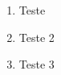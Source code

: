 \begin{question}

	\begin{enumerate}[label=\textbf{\alph*})]
		\item Teste
  		\item Teste 2
    	\item Teste 3
	\end{enumerate}

\end{question}
